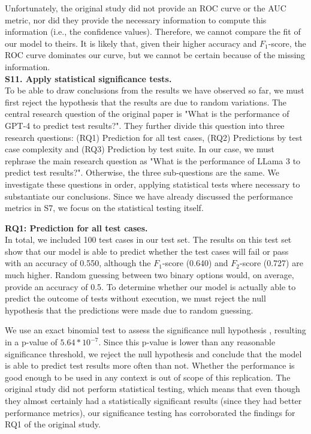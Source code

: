 \documentclass[a4paper]{article}
\begin{document}
Unfortunately, the original study did not provide an ROC curve or the AUC metric, nor did they provide the necessary information to compute this information (i.e., the confidence values). Therefore, we cannot compare the fit of our model to theirs. It is likely that, given their higher accuracy and $F_1$-score, the ROC curve dominates our curve, but we cannot be certain because of the missing information.\\

\textbf{S11. Apply statistical significance tests.}\\
To be able to draw conclusions from the results we have observed so far, we must first reject the hypothesis that the results are due to random variations. The central research question of the original paper is "What is the performance of GPT-4 to predict test results?". They further divide this question into three research questions: (RQ1) Prediction for all test cases, (RQ2) Predictions by test case complexity and (RQ3) Prediction by test suite. In our case, we must rephrase the main research question as "What is the performance of LLama 3 to predict test results?". Otherwise, the three sub-questions are the same. We investigate these questions in order, applying statistical tests where necessary to substantiate our conclusions. Since we have already discussed the performance metrics in S7, we focus on the statistical testing itself. 

\textbf{RQ1: Prediction for all test cases.}\\
In total, we included 100 test cases in our test set. The results on this test set show that our model is able to predict whether the test cases will fail or pass with an accuracy of 0.550, although the $F_1$-score (0.640) and $F_2$-score (0.727) are much higher. Random guessing between two binary options would, on average, provide an accuracy of 0.5. To determine whether our model is actually able to predict the outcome of tests without execution, we must reject the null hypothesis that the predictions were made due to random guessing. 

We use an exact binomial test to assess the significance null hypothesis \cite{lancaster1961significance}, resulting in a p-value of $5.64 * 10^{-7}$. Since this p-value is lower than any reasonable significance threshold, we reject the null hypothesis and conclude that the model is able to predict test results more often than not. Whether the performance is good enough to be used in any context is out of scope of this replication. The original study did not perform statistical testing, which means that even though they almost certainly had a statistically significant results (since they had better performance metrics), our significance testing has corroborated the findings for RQ1 of the original study.
\end{document}
